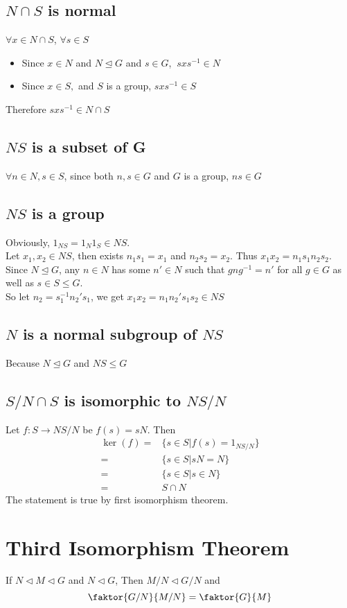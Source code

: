 \documentclass{article}
\begin{document}
	\subsection*{$N\cap S$ is normal}
	$\forall x\in N\cap S$, $\forall s\in S$\begin{itemize}
		\item Since $x\in N$ and $N\trianglelefteq G$ and $s\in G$, $\ sxs^{-1}\in N$
		\item Since $x\in S,$ and $S$ is a group, $sxs^{-1}\in S$
	\end{itemize}
	Therefore $sxs^{-1}\in N\cap S$
	\subsection*{$NS$ is a subset of G}
	$\forall n\in N,s\in S$, since both $n,s\in G$ and $G$ is a group, $ns\in G$
	\subsection*{$NS$ is a group}
	Obviously, $1_{NS}=1_N1_S\in NS$.\\
	Let $x_1,x_2\in NS$, then exists $n_1s_1=x_1$ and $n_2s_2=x_2$. Thus $x_1x_2=n_1s_1n_2s_2$.\\
	Since $N\trianglelefteq G$, any $n\in N$ has some $n'\in N$ such that $gng^{-1}=n'$ for all $g\in G$ as well as $s\in S\leq G$.\\
	So let $n_2=s_1^{-1}n_2's_1$, we get $x_1x_2=n_1n_2's_1s_2\in NS$
	\subsection*{$N$ is a normal subgroup of $NS$ }
	Because $N\trianglelefteq G$ and $NS\leq G$
	\subsection*{$S/N\cap S$ is isomorphic to $NS/N$}
	Let $f:S\rightarrow NS/N$ be $f(s)=sN$. Then\begin{align*}
		\ker(f) =& \{s\in S|f(s)=1_{NS/N}\}\\
		=&\{s\in S|sN=N\}\\
		=&\{s\in S|s\in N\}\\
		=&S\cap N
	\end{align*}
	The statement is true by first isomorphism theorem.
	
	\section*{Third Isomorphism Theorem}
	If $N\triangleleft M\triangleleft G$ and $N\triangleleft G$,
	Then $M/N \triangleleft G/N$ and $$
	\faktor{G/N}{M/N}=\faktor{G}{M}
	$$
\end{document}
